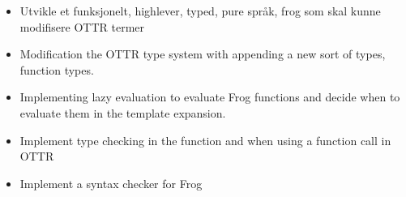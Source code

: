 \begin{itemize}
    \item Utvikle et funksjonelt, highlever, typed, pure språk, frog som skal kunne modifisere OTTR termer
    \item Modification the OTTR type system with appending a new sort of types, function types.
    \item Implementing lazy evaluation to evaluate Frog functions and decide when to evaluate them in the template expansion.
    \item Implement type checking in the function and when using a function call in OTTR
    \item Implement a syntax checker for Frog
\end{itemize}
